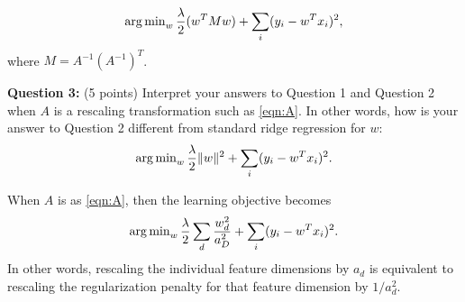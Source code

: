 \begin{solution}
$$\operatorname{arg\,min}_{w} \frac{\lambda}{2}(w^TMw) + \sum_{i}(y_i - w^Tx_i)^2,$$
where $M = A^{-1}(A^{-1})^T$.
\end{solution}

\smallskip

\textbf{Question 3:} (5 points) Interpret your answers to Question 1 and Question 2 when  $A$ is a rescaling transformation such as \eqref{eqn:A}. In other words, how is your answer to Question 2 different from standard ridge regression for $w$:
$$
\operatorname{arg\,min}_{w} \frac{\lambda}{2}\|w\|^2 + \sum_{i}(y_i - w^Tx_i)^2.
$$

\begin{solution}
When $A$ is as \eqref{eqn:A}, then the learning objective becomes
$$
\operatorname{arg\,min}_{w} \frac{\lambda}{2}\sum_d \frac{w_d^2}{a_D^2} + \sum_{i}(y_i - w^Tx_i)^2.
$$
In other words, rescaling the individual feature dimensions by $a_d$ is equivalent to rescaling the regularization penalty for that feature dimension by $1/a_d^2$.
\end{solution}
